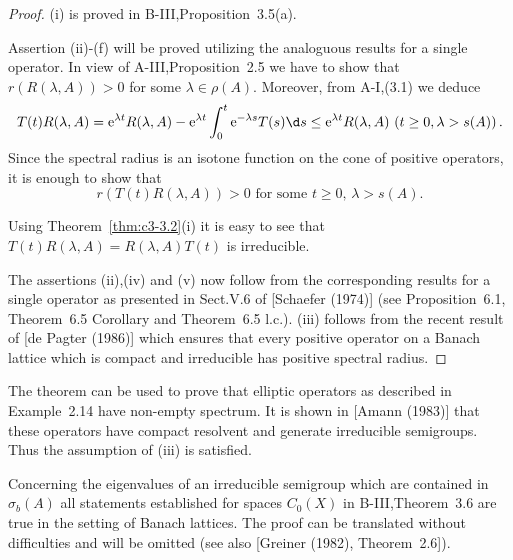 \begin{proof}
	(i) is proved in B-III,Proposition~3.5(a).
	
	Assertion (ii)-(f) will be proved utilizing the analoguous results for a single operator.
	In view of A-III,Proposition~2.5 we have to show that $r(R(\lambda,A)) > 0$ for some $\lambda \in \rho(A)$.
	Moreover, from A-I,(3.1) we deduce
	\begin{align*}
		T(t)R(\lambda,A) = \mathrm{e}^{\lambda t}R(\lambda,A) - \mathrm{e}^{\lambda t}\int_{0}^{t} \mathrm{e}^{-\lambda s}T(s)\d s \leq \mathrm{e}^{\lambda t}R(\lambda,A) \ (t\geq 0, \lambda>s(A))\,.
	\end{align*}
	Since the spectral radius is an isotone function on the cone of positive operators, it is enough to show that
	\begin{equation}\label{eq:c3-3.12}
		r(T(t)R(\lambda,A)) > 0 \text{ for some } t \geq 0,\, \lambda > s(A).
	\end{equation}
	
	Using Theorem~\ref{thm:c3-3.2}(i) it is easy to see that $T(t)R(\lambda,A) = R(\lambda,A)T(t)$ is irreducible.
	
	The assertions (ii),(iv) and (v) now follow from the corresponding results for a single operator as presented in Sect.V.6 of [Schaefer (1974)] (see Proposition~6.1, Theorem~6.5 Corollary and Theorem~6.5 l.c.).
	(iii) follows from the recent result of [de Pagter (1986)] which ensures that every positive operator on a Banach lattice which is compact and irreducible has positive spectral radius.
\end{proof}

The theorem can be used to prove that elliptic operators as described in Example~2.14 have non-empty spectrum.
It is shown in [Amann (1983)] that these operators have compact resolvent and generate irreducible semigroups.
Thus the assumption of (iii) is satisfied.

Concerning the eigenvalues of an irreducible semigroup which are contained in $\sigma_{b}(A)$ all statements established for spaces $C_{0}(X)$ in B-III,Theorem~3.6 are true in the setting of Banach lattices.
The proof can be translated without difficulties and will be omitted (see also [Greiner (1982), Theorem~2.6]).

